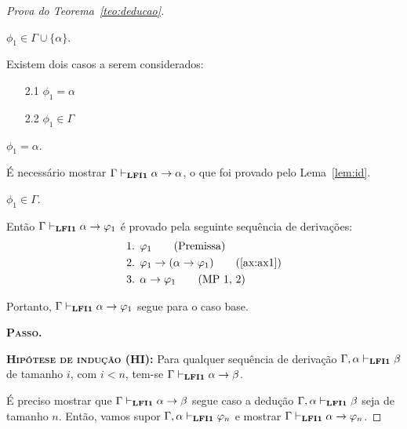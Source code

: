 \begin{proof}[Prova do Teorema~\ref{teo:deducao}]
\begin{provaporcasos}
                    \casodeprova{} $\phi_{1} \in \Gamma \cup \{\alpha\}$. 
                    
                    Existem dois casos a serem considerados:

                    \begin{enumerate}
                        \item[2.1] $\phi_{1} = \alpha$
                        \item[2.2] $\phi_{1} \in \Gamma$
                    \end{enumerate}

                    \begin{provaporsubcasos}
                        \subcasodeprova{} $\phi_{1} = \alpha$. 
                        
                            É necessário mostrar $\Gamma \vdash_{{\normalfont\textbf{LFI1}}{}} \alpha \to \alpha$, o que foi provado pelo Lema~\ref{lem:id}.

                        \subcasodeprova{} $\phi_{1} \in \Gamma$.
                        
                            Então $\Gamma \vdash_{{\normalfont\textbf{LFI1}}{}} \alpha \to \varphi_{1}$ é provado pela seguinte sequência de derivações:
                            \begin{align*}
                                & \text{1. } \phi_{1} \tag{Premissa}\\
                                & \text{2. } \phi_{1} \to (\alpha \to \phi_{1}) \tag{\ref{ax:ax1}}\\
                                & \text{3. } \alpha \to \phi_{1} \tag{MP 1, 2}
                            \end{align*}
                    \end{provaporsubcasos}
                    
                \end{provaporcasos}
                
                Portanto, $\Gamma \vdash_{{\normalfont\textbf{LFI1}}{}} \alpha \to \varphi_{1}$ segue para o caso base.

            \noindent \textbf{\textsc{Passo.}}

            \noindent \textbf{\textsc{Hipótese de indução (HI):}} Para qualquer sequência de derivação $\Gamma, \alpha \vdash_{{\normalfont\textbf{LFI1}}{}} \beta$ de tamanho $i$, com $i < n$, tem-se $\Gamma \vdash_{{\normalfont\textbf{LFI1}}{}} \alpha \to \beta$. 

            É preciso mostrar que $\Gamma \vdash_{{\normalfont\textbf{LFI1}}{}} \alpha \to \beta$ segue caso a dedução $\Gamma, \alpha \vdash_{{\normalfont\textbf{LFI1}}{}} \beta$ seja de tamanho $n$. Então, vamos supor $\Gamma, \alpha \vdash_{{\normalfont\textbf{LFI1}}{}} \varphi_{n}$ e mostrar $\Gamma \vdash_{{\normalfont\textbf{LFI1}}{}} \alpha \to \varphi_{n}$.
            

\end{proof}

